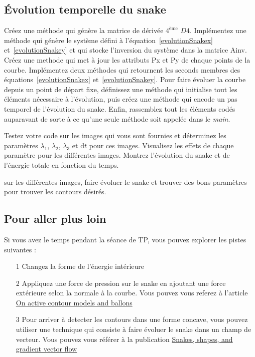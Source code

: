 \documentclass[10pt,a4paper]{article}
\begin{document}
\subsection{\'{E}volution temporelle du snake}
Cr\'{e}ez une m\'{e}thode qui g\'{e}n\`{e}re la matrice de d\'{e}riv\'{e}e $4^{\text{\`eme}}$ $D4$. Impl\'{e}mentez une m\'{e}thode qui g\'{e}n\`{e}re le syst\`{e}me d\'{e}fini \`{a} l'\'{e}quation~\eqref{evolutionSnakex} et~\eqref{evolutionSnakey}  et qui stocke l'inversion du syst\`{e}me dans la matrice Ainv. Cr\'{e}ez une methode qui met \`{a} jour les attributs Px et Py de chaque points de la courbe. Impl\'{e}mentez deux m\'{e}thodes qui retournent les seconds membres des \'{e}quations~\eqref{evolutionSnakex} et~\eqref{evolutionSnakey}. Pour faire \'{e}voluer la courbe depuis un point de d\'{e}part fixe, d\'{e}finissez une m\'{e}thode qui initialise tout les \'{e}l\'{e}ments n\'{e}cessaire \`{a} l'\'{e}volution, puis cr\'{e}ez une m\'{e}thode qui encode un pas temporel de l'\'{e}volution du snake. Enfin, rassemblez tout les \'{e}l\'{e}ments cod\'{e}s auparavant de sorte \`{a} ce qu'une seule m\'{e}thode soit appel\'{e}e dans le \textit{main}. 

Testez votre code sur les images qui vous sont fournies et d\'{e}terminez les param\`{e}tres $\lambda_1$, $\lambda_2$, $\lambda_3$ et $\mathrm{d}t$ pour ces images. Visualisez les effets de chaque param\`{e}tre pour les diff\'{e}rentes images. Montrez l'\'{e}volution du snake et de l'\'{e}nergie totale en fonction du temps.

sur les diff\'{e}rentes images, faire \'{e}voluer le snake et trouver des bons param\`{e}tres pour trouver les contours d\'{e}sir\'{e}s.

\subsection{Pour aller plus loin}
Si vous avez le temps pendant la s\'{e}ance de TP, vous pouvez explorer les pistes suivantes : 
\begin{itemize}
	\item[1] Changez la forme de l'\'{e}nergie int\'{e}rieure
	\item[2] Appliquez une force de pression sur le snake en ajoutant une force ext\'{e}rieure selon la normale \`{a} la courbe. Vous pouvez vous referez \`{a} l'article \href{http://ac.els-cdn.com/104996609190028N/1-s2.0-104996609190028N-main.pdf?_tid=8cc41376-c1ff-11e4-a8e9-00000aab0f26&acdnat=1425426585_a1dae6c4928c4fa3bc99d9bffe5d920c}{On active contour models and ballons}
	\item[3] Pour arriver \`{a} detecter les contours dans une forme concave, vous pouvez utiliser une technique qui consiste \`{a} faire \'{e}voluer le snake dans un champ de vecteur. Vous pouvez vous r\'{e}f\'{e}rer \`{a} la publication \href{http://www-artemis.it-sudparis.eu/~rougon/IMA4509/Controle/Sujets/Xu-IP-1998.pdf}{Snakes, shapes, and gradient vector flow}
\end{itemize}
\end{document}
